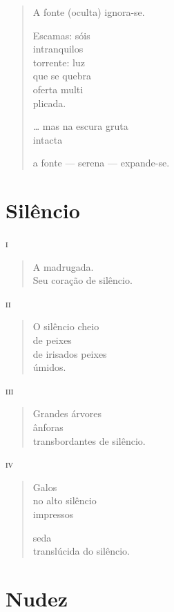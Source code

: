 \begin{verse}
A fonte (oculta) ignora-se.

Escamas: sóis\\
\qquad\qquad intranquilos\\
torrente: luz\\
que se quebra\\
oferta multi\\
\qquad\qquad plicada.

\ldots{} mas na escura gruta\\
\qquad intacta

a fonte --- serena --- expande-se.
\end{verse}

\chapter{Silêncio}

\forceindent\textsc{i}

\begin{verse}
A madrugada.\\
Seu coração de silêncio.
\end{verse}

\medskip
\textsc{ii}

\begin{verse}
O silêncio cheio\\
de peixes\\
de irisados peixes\\
úmidos.
\end{verse}

\medskip
\textsc{iii}

\begin{verse}
Grandes árvores\\
ânforas\\
transbordantes de silêncio.
\end{verse}

\medskip
\textsc{iv}

\begin{verse}
Galos\\
no alto silêncio\\
impressos

seda\\
translúcida do silêncio.
\end{verse}

\chapter{Nudez}

